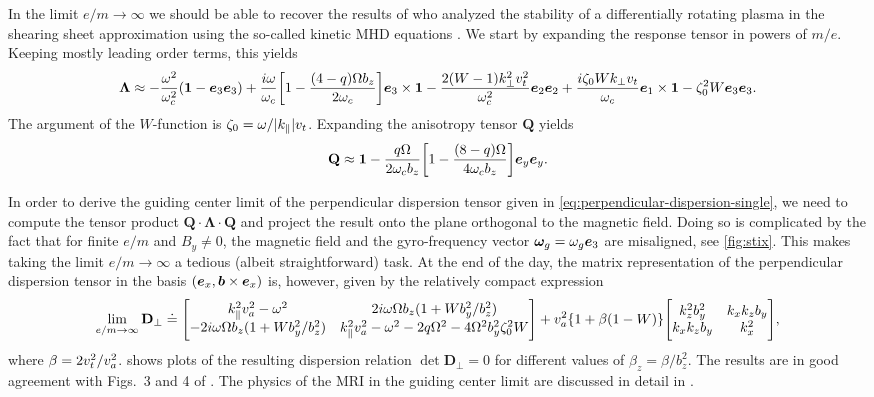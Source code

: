 \documentclass[aps,pre,notitlepage,amsmath,amssymb,amsfonts,nobibnotes,nofootinbib,superscriptaddress]{revtex4-1}
\begin{document}
In the limit $e/m\to\infty$ we should be able to recover the results of
\citet{Quataert2002} who analyzed the stability of a differentially rotating
plasma in the shearing sheet approximation using the so-called kinetic MHD
equations \citep[see e.g.][]{Grad1961,Kulsrud1983,Hazeltine2004}. We start by
expanding the response tensor in powers of $m/e$. Keeping mostly leading order
terms, this yields
\begin{equation}
  \mathbf{\Lambda} \approx
  -\frac{\omega^2}{\omc^2}(\mathbf{1} - \vec{e}_3\vec{e}_3)
  + \frac{i\omega}{\omc}\left[1 - \frac{(4-q)\Omega b_z}{2\omc}\right]
  \vec{e}_3\times\mathbf{1}
  - \frac{2(W-1)k_\perp^2\vt^2}{\omc^2}\vec{e}_2\vec{e}_2
  + \frac{i\zeta_0 Wk_\perp\vt}{\omc}\vec{e}_1\times\mathbf{1}
  - \zeta_0^2 W\vec{e}_3\vec{e}_3.
\end{equation}
The argument of the $W$-function is $\zeta_0=\omega/|k_\parallel|v_t$.
Expanding the anisotropy tensor $\mathbf{Q}$ yields
\begin{equation}
  \mathbf{Q} \approx \mathbf{1} - \frac{q\Omega}{2\omc b_z}
  \left[1 - \frac{(8-q)\Omega}{4\omc b_z}\right]\ey\ey.
\end{equation}

In order to derive the guiding center limit of the perpendicular dispersion
tensor given in \cref{eq:perpendicular-dispersion-single}, we need to compute
the tensor product $\mathbf{Q}\cdot\mathbf{\Lambda}\cdot\mathbf{Q}$ and
project the result onto the plane orthogonal to the magnetic field. Doing so
is complicated by the fact that for finite $e/m$ and $B_y\ne{}0$, the magnetic
field and the gyro-frequency vector $\bm{\omega}_g=\omega_g\bm{e}_3$ are misaligned, see
\cref{fig:stix}. This makes taking the limit $e/m\to\infty$ a tedious (albeit
straightforward) task. At the end of the day, the matrix representation of the
perpendicular dispersion tensor 
in the basis $(\bm{e}_x,\bm{b}\times\bm{e}_x)$ is, however, given by the relatively
compact expression
\begingroup
\renewcommand*{\arraystretch}{1.4}
\begin{equation}
  \label{eq:DRguiding}
  \lim_{e/m\to\infty}\mathbf{D}_\perp \doteq
  \Bigg[\begin{matrix}
    k_\parallel^2\va^2 - \omega^2
    & 2i\omega\Omega b_z (1 + Wb_y^2/b_z^2) \\
    - 2i\omega\Omega b_z (1 + Wb_y^2/b_z^2)
    & k_\parallel^2\va^2 - \omega^2 - 2q\Omega^2 - 4\Omega^2b_y^2\zeta_0^2W
  \end{matrix}\Bigg]
  + \va^2\{1 + \beta(1-W)\}
  \Bigg[\begin{matrix}
    k_z^2 b_y^2 & k_x k_z b_y \\
    k_x k_z b_y & k_x^2
  \end{matrix}\Bigg],
\end{equation}
\endgroup
where $\beta=2v_t^2/v_a^2$.  shows plots of the
resulting dispersion relation $\det\mathbf{D}_\perp=0$ for different values of
$\beta_z=\beta/b_z^2$. The results are in good agreement with Figs.~3 and 4 of
\citet{Quataert2002}. The physics of the MRI in the guiding center limit are
discussed in detail in \citet{Quataert2002} \citep[see also][]{Balbus2004}.
\end{document}
